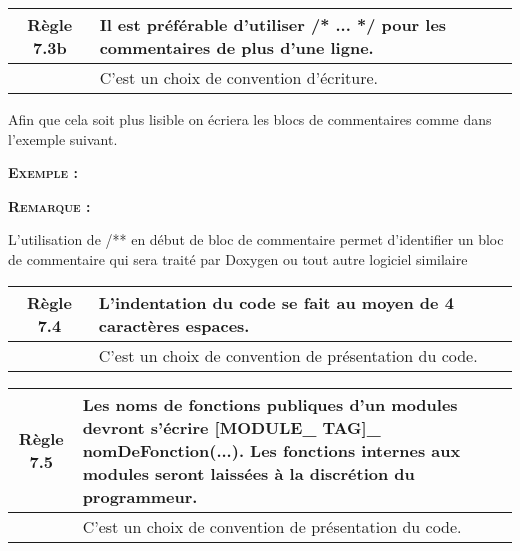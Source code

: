 \medskip

\begin{center}
\begin{tabular}{|c p{12.3cm}|}
\hline
\rowcolor{red!10}\textbf{Règle 7.3b} & Il est préférable d’utiliser /* ... */ pour les commentaires de plus d’une ligne.\\ \hline
 & C’est un choix de convention d’écriture. \\ \hline
\hline
\end{tabular}
\end{center}

Afin que cela soit plus lisible on écriera les blocs de commentaires comme dans l’exemple suivant.

\smallskip
\begin{large}
\textbf{\textsc{Exemple :}}
\end{large}


\smallskip
\begin{large}
\textbf{\textsc{Remarque :}}
\end{large}
L’utilisation de /** en début de bloc de commentaire permet d’identifier un bloc de commentaire qui sera traité par Doxygen ou tout autre logiciel similaire

\medskip

\begin{center}
\begin{tabular}{|c p{12.3cm}|}
\hline
\rowcolor{red!10}\textbf{Règle 7.4} & L’indentation du code se fait au moyen de 4 caractères espaces.\\ \hline
 & C’est un choix de convention de présentation du code. \\ \hline
\hline
\end{tabular}
\end{center}

\medskip

\begin{center}
\begin{tabular}{|c p{12.3cm}|}
\hline
\rowcolor{red!10}\textbf{Règle 7.5} & Les noms de fonctions publiques d’un modules devront s’écrire [MODULE\_ TAG]\_ nomDeFonction(...). Les fonctions internes aux modules seront laissées à la discrétion du programmeur.\\ \hline
 & C’est un choix de convention de présentation du code. \\ \hline
\hline
\end{tabular}
\end{center}

\pagebreak
